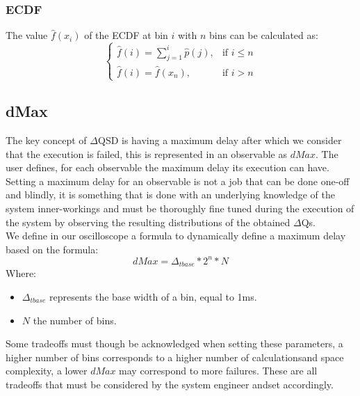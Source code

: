     \subsubsection{ECDF}
    The value $\hat{f}(x_i)$ of the ECDF at bin $i$ with $n$ bins can be calculated as:
    \begin{equation}
        \begin{cases}
            \hat{f}(i) = \sum_{j=1}^{i} \hat{p}(j), & \text{if } i \le n \\  
            \hat{f}(i) = \hat{f}(x_n), & \text{if } i > n 
        \end{cases}
        \label{eq:cdf}
    \end{equation}
    \begin{center}
    \end{center}
    \subsection{dMax}
        The key concept of $\Delta$QSD is having a maximum delay after which we consider that the execution is failed, this is represented in an observable as $dMax$. The user defines, for each observable the maximum delay its execution can have. \\ 
Setting a maximum delay for an observable is not a job that can be done one-off and blindly, it is something that is done with an underlying knowledge of the system inner-workings and must be thoroughly fine tuned during the execution of the system by observing the resulting distributions of the obtained $\Delta$Qs. \\

We define in our oscilloscope a formula to dynamically define a maximum delay based on the formula:
\begin{equation}
    dMax = \Delta_{t base} * 2^n * N  
    \label{eq:dMax}
\end{equation}
Where:
\begin{itemize}
    \item $\Delta_{t base}$ represents the base width of a bin, equal to 1ms.
    \item $N$ the number of bins.
\end{itemize}

Some tradeoffs must though be acknowledged when setting these parameters, a higher number of bins corresponds to a higher number of calculationsand space complexity, a lower $dMax$ may correspond to more failures. These are all tradeoffs that must be considered by the system engineer andset accordingly.
